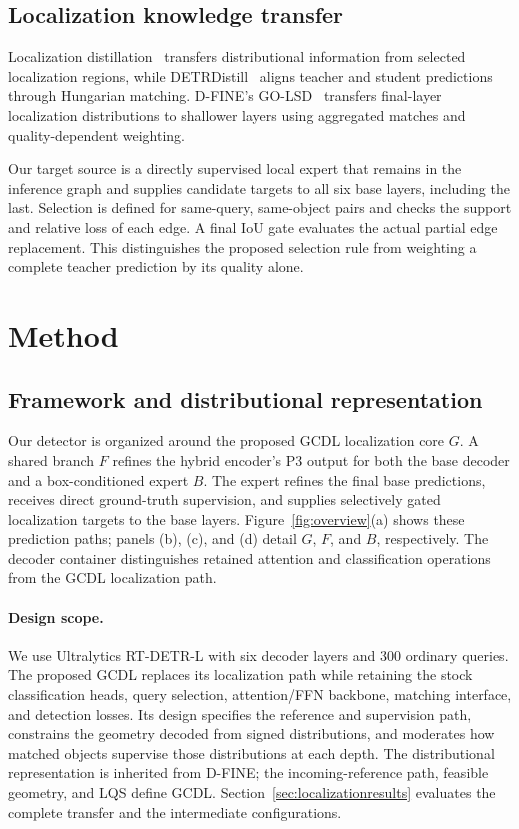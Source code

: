 \subsection{Localization knowledge transfer}
Localization distillation~\cite{zheng2022ld} transfers distributional information from selected localization regions, while DETRDistill~\cite{chang2023detrdistill} aligns teacher and student predictions through Hungarian matching. D-FINE's GO-LSD~\cite{peng2025dfine} transfers final-layer localization distributions to shallower layers using aggregated matches and quality-dependent weighting.

Our target source is a directly supervised local expert that remains in the inference graph and supplies candidate targets to all six base layers, including the last. Selection is defined for same-query, same-object pairs and checks the support and relative loss of each edge. A final IoU gate evaluates the actual partial edge replacement. This distinguishes the proposed selection rule from weighting a complete teacher prediction by its quality alone.

\section{Method}
\subsection{Framework and distributional representation}
Our detector is organized around the proposed GCDL localization core $G$. A shared branch $F$ refines the hybrid encoder's P3 output for both the base decoder and a box-conditioned expert $B$. The expert refines the final base predictions, receives direct ground-truth supervision, and supplies selectively gated localization targets to the base layers. Figure~\ref{fig:overview}(a) shows these prediction paths; panels (b), (c), and (d) detail $G$, $F$, and $B$, respectively. The decoder container distinguishes retained attention and classification operations from the GCDL localization path.


\paragraph{Design scope.}
We use Ultralytics RT-DETR-L with six decoder layers and 300 ordinary queries. The proposed GCDL replaces its localization path while retaining the stock classification heads, query selection, attention/FFN backbone, matching interface, and detection losses. Its design specifies the reference and supervision path, constrains the geometry decoded from signed distributions, and moderates how matched objects supervise those distributions at each depth. The distributional representation is inherited from D-FINE; the incoming-reference path, feasible geometry, and LQS define GCDL. Section~\ref{sec:localizationresults} evaluates the complete transfer and the intermediate configurations.



